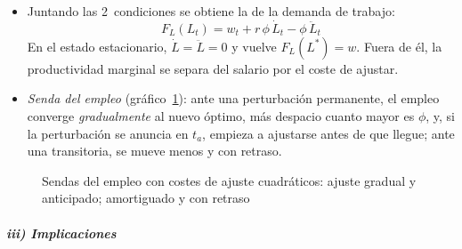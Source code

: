 \documentclass[11pt]{article}
\begin{document}
\begin{itemize}
\begin{itemize}
  \item Juntando las 2~condiciones se obtiene la  de la demanda de trabajo:
    \begin{equation}
    F_L(L_t)=w_t+r\,\phi\,\dot L_t-\phi\,\ddot L_t\label{eq:euler-empleo}
    \end{equation}
    En el estado estacionario, $\dot L=\ddot L=0$ y vuelve $F_L(L^*)=w$. Fuera de él, la productividad marginal se separa del salario por el coste de ajustar.
  \item \emph{Senda del empleo} (gráfico~\ref{fig:sendas-cuadraticos}): ante una perturbación permanente, el empleo converge \emph{gradualmente} al nuevo óptimo, más despacio cuanto mayor es $\phi$, y, si la perturbación se anuncia en $t_a$, empieza a ajustarse antes de que llegue; ante una transitoria, se mueve menos y con retraso.
  \end{itemize}
\end{itemize}

\begin{figure}[H]
\centering
\caption{Sendas del empleo con costes de ajuste cuadráticos: ajuste gradual y anticipado; amortiguado y con retraso}\label{fig:sendas-cuadraticos}
\end{figure}

\subparagraph{iii) Implicaciones}
\end{document}
